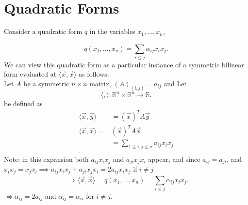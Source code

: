 \documentclass{report}
\begin{document}
  \section{Quadratic Forms}
 Consider a quadratic form $ q$ in the variables $ x_1, \ldots , x_n$,
 
 \[
 q \left( x_1,  \ldots , x_n \right) = \sum\limits_{i \le j}^{}  \alpha_{ij} x_i x_j 
 .\] 
 We can view this quadratic form as a particular instance of a symmetric bilinear form evaluated at  $ \langle  \vec{ x} , \vec{ x}   \rangle $ as follows:\\

 Let $ A$ be a symmetric $n \times n$  matrix, $ \left( A \right) _{ (i,j) } =a_{ij}$ and Let 
 \[
 \langle ,  \rangle : \mathbb{R} ^{n} \times  \mathbb{R} ^{n} \to \mathbb{R} 
 .\] 
 be defined as
 \begin{align*}
  \langle \vec{ x} , \vec{ y}   \rangle &= \left( \vec{ x}  \right) ^{T} A \vec{ y} \\
  \langle \vec{ x} ,\vec{ x}   \rangle =& \left( \vec{ x}  \right) ^{T} A \vec{ x} \\
  &= \sum\limits_{1 \leq i,j \leq n}^{} a_{ij} x_i x_j\\
 .\end{align*}
 Note: in this expansion both $ a_{ij} x_i x_j$ and $ a_{ji} x_j x_i$ appear, and since $ a_{ij} = a_{ji}$, and $ x_i x_j= x_j x_i \implies a_{ij} x_i x_j + a_{ji}x_j x_i = 2a_{ij}x_i x_j $ if $ i \neq j$
 \[
 \implies \langle \vec{ x} ,\vec{ x}   \rangle = q \left( x_1, \ldots , x_n \right) = \sum\limits_{i \le j}^{}  \alpha_{ij} x_i x_j 
 .\] 
 $ \iff \alpha_{ij}= 2 a_{ij}$ and $ \alpha _{ ij} = \alpha _{ i i}$ for $ i \neq j$.\\
   
\end{document}
